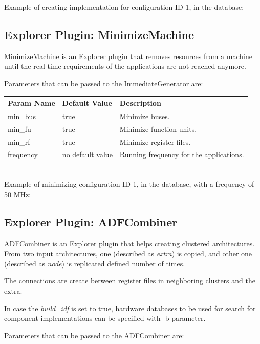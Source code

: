 \documentclass[twoside]{tceusermanual}
\begin{document}
Example of creating implementation for configuration ID 1, in the database:


\subsection{Explorer Plugin: MinimizeMachine}
MinimizeMachine is an Explorer plugin that removes resources from a machine
until the real time requirements of the applications are not reached anymore.

Parameters that can be passed to the ImmediateGenerator are:

\begin{tabular}{p{}p{}
                p{}}
\textbf{Param Name} &\textbf{Default Value} &\textbf{Description} \\
\hline
min\_bus & true & Minimize buses. \\
min\_fu & true & Minimize function units. \\
min\_rf & true & Minimize register files. \\
frequency & no default value & Running frequency for the applications. \\
\end{tabular}\\

Example of minimizing configuration ID 1, in the database, with a frequency
of 50 MHz:


\subsection{Explorer Plugin: ADFCombiner}
ADFCombiner is an Explorer plugin that helps creating clustered architectures.
From two input architectures, one (described as \textit{extra}) is copied,
 and other one (described as \textit{node}) is replicated defined
number of times.

The connections are create between register files in neighboring clusters
and the extra.

In case the \textit{build\_idf} is set to true, hardware databases to be used
for search for component implementations can be specified with -b parameter.

Parameters that can be passed to the ADFCombiner are:
\end{document}
